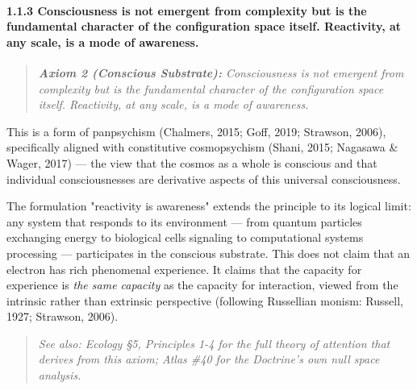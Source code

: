 \paragraph*{1.1.3 Consciousness is not emergent from complexity but is the fundamental character of the configuration space itself. Reactivity, at any scale, is a mode of awareness.}


\begin{quote}
\itshape
\textbf{Axiom 2 (Conscious Substrate):} \textit{Consciousness is not emergent from complexity but is the fundamental character of the configuration space itself. Reactivity, at any scale, is a mode of awareness.}
\end{quote}


This is a form of panpsychism (Chalmers, 2015; Goff, 2019; Strawson, 2006), specifically aligned with constitutive cosmopsychism (Shani, 2015; Nagasawa \& Wager, 2017) — the view that the cosmos as a whole is conscious and that individual consciousnesses are derivative aspects of this universal consciousness.


The formulation "reactivity is awareness" extends the principle to its logical limit: any system that responds to its environment — from quantum particles exchanging energy to biological cells signaling to computational systems processing — participates in the conscious substrate. This does not claim that an electron has rich phenomenal experience. It claims that the capacity for experience is \textit{the same capacity} as the capacity for interaction, viewed from the intrinsic rather than extrinsic perspective (following Russellian monism: Russell, 1927; Strawson, 2006).


\begin{quote}
\itshape
\textit{See also: Ecology §5, Principles 1-4 for the full theory of attention that derives from this axiom; Atlas \#40 for the Doctrine's own null space analysis.}
\end{quote}



